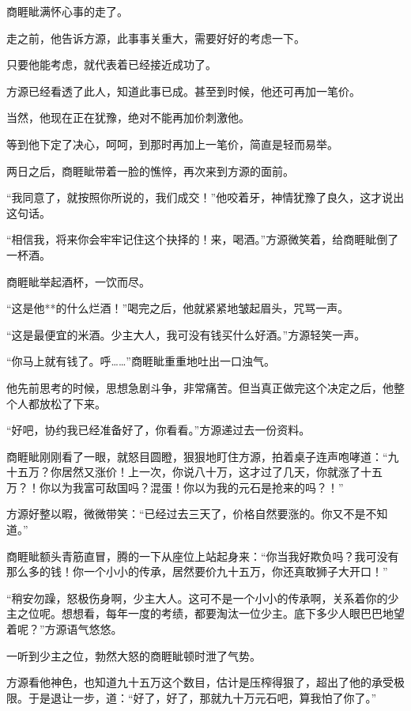 
\begin{this_body}

商睚眦满怀心事的走了。

走之前，他告诉方源，此事事关重大，需要好好的考虑一下。

只要他能考虑，就代表着已经接近成功了。

方源已经看透了此人，知道此事已成。甚至到时候，他还可再加一笔价。

当然，他现在正在犹豫，绝对不能再加价刺激他。

等到他下定了决心，呵呵，到那时再加上一笔价，简直是轻而易举。

两日之后，商睚眦带着一脸的憔悴，再次来到方源的面前。

“我同意了，就按照你所说的，我们成交！”他咬着牙，神情犹豫了良久，这才说出这句话。

“相信我，将来你会牢牢记住这个抉择的！来，喝酒。”方源微笑着，给商睚眦倒了一杯酒。

商睚眦举起酒杯，一饮而尽。

“这是他**的什么烂酒！”喝完之后，他就紧紧地皱起眉头，咒骂一声。

“这是最便宜的米酒。少主大人，我可没有钱买什么好酒。”方源轻笑一声。

“你马上就有钱了。呼……”商睚眦重重地吐出一口浊气。

他先前思考的时候，思想急剧斗争，非常痛苦。但当真正做完这个决定之后，他整个人都放松了下来。

“好吧，协约我已经准备好了，你看看。”方源递过去一份资料。

商睚眦刚刚看了一眼，就怒目圆瞪，狠狠地盯住方源，拍着桌子连声咆哮道：“九十五万？你居然又涨价！上一次，你说八十万，这才过了几天，你就涨了十五万？！你以为我富可敌国吗？混蛋！你以为我的元石是抢来的吗？！”

方源好整以暇，微微带笑：“已经过去三天了，价格自然要涨的。你又不是不知道。”

商睚眦额头青筋直冒，腾的一下从座位上站起身来：“你当我好欺负吗？我可没有那么多的钱！你一个小小的传承，居然要价九十五万，你还真敢狮子大开口！”

“稍安勿躁，怒极伤身啊，少主大人。这可不是一个小小的传承啊，关系着你的少主之位呢。想想看，每年一度的考绩，都要淘汰一位少主。底下多少人眼巴巴地望着呢？”方源语气悠悠。

一听到少主之位，勃然大怒的商睚眦顿时泄了气势。

方源看他神色，也知道九十五万这个数目，估计是压榨得狠了，超出了他的承受极限。于是退让一步，道：“好了，好了，那就九十万元石吧，算我怕了你了。”


\end{this_body}
